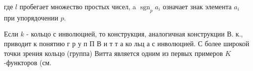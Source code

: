 \documentclass[10pt]{article}
\begin{document}
где $l$ пробегает множество простых чисел, a $\operatorname{sgn}_{p} a_{i}$ означает знак элемента $a_{i}$ при упорядочении $p$.



Если $k$ - кольцо с инволюцией, то конструкция, аналогичная конструкции В. к., приводит к понятию г р у п П В и т т а ко льц а с инволюцией. С более широкой точки зрения кольцо (группа) Витта является одним из первых примеров $K$-функторов (см.
\end{document}

